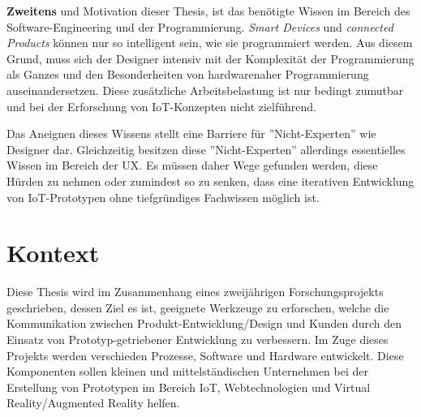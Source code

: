 \textbf{Zweitens} und Motivation dieser Thesis, ist das benötigte Wissen im Bereich des Software-Engineering und der Programmierung. \textit{Smart Devices} und \textit{connected Products} können nur so intelligent sein, wie sie programmiert werden. Aus diesem Grund, muss sich der Designer intensiv mit der Komplexität der Programmierung als Ganzes und den Besonderheiten von hardwarenaher Programmierung auseinandersetzen. Diese zusätzliche Arbeitsbelastung ist nur bedingt zumutbar und bei der Erforschung von \ac{IoT}-Konzepten nicht zielführend.

Das Aneignen dieses Wissens stellt eine Barriere für ''Nicht-Experten'' wie Designer dar. Gleichzeitig besitzen diese ''Nicht-Experten'' allerdings essentielles Wissen im Bereich der \ac{UX}. Es müssen daher Wege gefunden werden, diese Hürden zu nehmen oder zumindest so zu senken, dass eine iterativen Entwicklung von \ac{IoT}-Prototypen ohne tiefgründiges Fachwissen möglich ist. 

\section{Kontext}\label{sec:1_kontext}
Diese Thesis wird im Zusammenhang eines zweijährigen Forschungsprojekts geschrieben, dessen Ziel es ist, geeignete Werkzeuge zu erforschen, welche die Kommunikation zwischen Produkt-Entwicklung/Design und Kunden durch den Einsatz von Prototyp-getriebener Entwicklung zu verbessern. Im Zuge dieses Projekts werden verschieden Prozesse, Software und Hardware entwickelt. Diese Komponenten sollen kleinen und mittelständischen Unternehmen bei der Erstellung von Prototypen im Bereich \ac{IoT}, Webtechnologien und Virtual Reality/Augmented Reality helfen.

